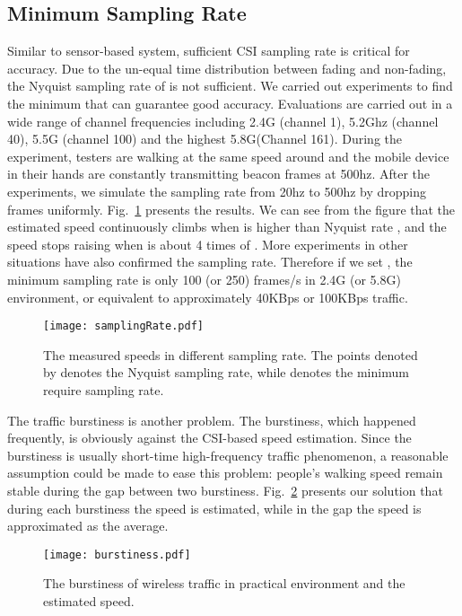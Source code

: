 \subsection{Minimum Sampling Rate}
Similar to sensor-based system, sufficient CSI sampling rate is critical for accuracy.
Due to the un-equal time distribution between fading and non-fading,
 the Nyquist sampling rate of  is not
 sufficient.
We carried out experiments to find the minimum  that
 can guarantee good accuracy.
Evaluations are carried out in a wide range of channel frequencies
including 2.4G (channel 1), 5.2Ghz (channel 40), 5.5G (channel 100)
and the highest 5.8G(Channel 161).
During the experiment, testers are walking at the same speed around
  and the mobile device in their hands are constantly
 transmitting beacon frames at 500hz.
After the experiments, we simulate the sampling rate  from 20hz
 to 500hz by dropping frames uniformly.
 Fig.~\ref{fig:sampling} presents the results. We can see from the figure that
 the estimated speed  continuously climbs when  is higher than
 Nyquist rate , and the speed stops raising when  is about 4
 times of . More experiments in other situations have
 also confirmed the  sampling rate. Therefore if we set
  , the minimum sampling rate is only 100 (or 250)
 frames/s in 2.4G (or 5.8G) environment,  or equivalent to approximately
 40KBps or 100KBps traffic.

\begin{figure}[hptb]
\begin{center}
\texttt{[image: samplingRate.pdf]}
\end{center}
\vspace{-0.3in}
\caption{The measured speeds in different sampling rate.  The points
  denoted by  denotes the Nyquist sampling rate, while
   denotes the minimum require sampling rate.}
\label{fig:sampling}
\vspace{-0.1in}
\end{figure}

The traffic burstiness is another problem. The burstiness, which
happened frequently, is obviously against the CSI-based speed
estimation. Since the burstiness is usually short-time high-frequency
traffic phenomenon, a reasonable assumption could be made to ease this
problem: people's walking speed remain stable during the gap between
two burstiness. Fig.~\ref{fig:burstiness} presents our solution that
during each burstiness the speed is estimated, while in the gap the
speed is approximated as the average.
\begin{figure}[hptb]
\begin{center}
\texttt{[image: burstiness.pdf]}
\end{center}
\vspace{-0.3in}
\caption{The burstiness of wireless traffic in practical environment
  and the estimated speed. }
\label{fig:burstiness}
\vspace{-0.2in}
\end{figure}
